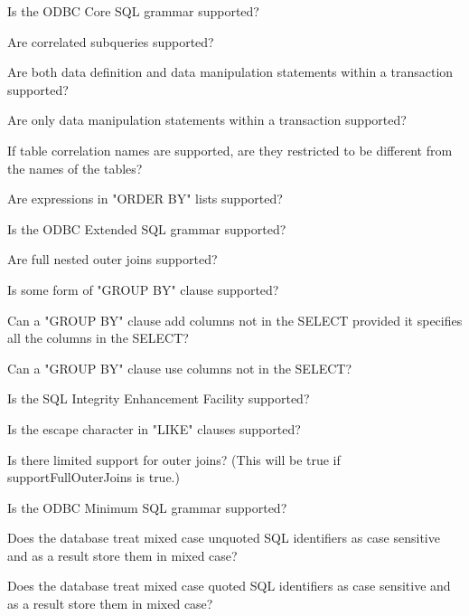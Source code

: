 \begin{description}
Is the ODBC Core SQL grammar supported? 

Are correlated subqueries supported?

Are both data definition and data manipulation statements within a transaction supported? 

Are only data manipulation statements within a transaction supported? 

If table correlation names are supported, are they restricted to be different from the names of the tables? 

Are expressions in "ORDER BY" lists supported? 

Is the ODBC Extended SQL grammar supported? 

Are full nested outer joins supported? 

Is some form of "GROUP BY" clause supported? 

Can a "GROUP BY" clause add columns not in the SELECT provided it specifies all the columns in the SELECT? 

Can a "GROUP BY" clause use columns not in the SELECT? 

Is the SQL Integrity Enhancement Facility supported? 

Is the escape character in "LIKE" clauses supported?

Is there limited support for outer joins? (This will be true if supportFullOuterJoins is true.) 

Is the ODBC Minimum SQL grammar supported?

Does the database treat mixed case unquoted SQL identifiers as case sensitive and as a result store them in mixed case?

Does the database treat mixed case quoted SQL identifiers as case sensitive and as a result store them in mixed case?


\end{description}
